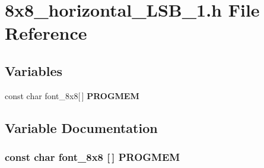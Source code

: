 \section{8x8\_\-horizontal\_\-LSB\_\-1.h File Reference}
\label{8x8__horizontal__LSB__1_8h}
\subsection*{Variables}
\begin{DoxyCompactItemize}
\item 
const char font\_\-8x8[$\,$] {\bf PROGMEM}
\end{DoxyCompactItemize}


\subsection{Variable Documentation}
\subsubsection[{PROGMEM}]{\setlength{\rightskip}{0pt plus 5cm}const char font\_\-8x8 [$\,$] {\bf PROGMEM}}\label{8x8__horizontal__LSB__1_8h_aea5b8cca94e34368e475868cc6493943}
